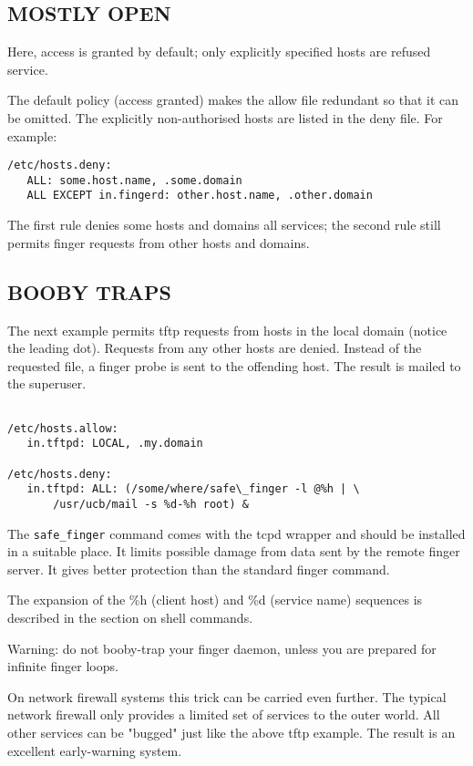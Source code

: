\documentclass[11pt,twoside,onecolumn]{book}
\begin{document}
\subsection*{MOSTLY OPEN}

Here, access is granted by default; only explicitly specified hosts are
refused service. 

The default policy (access granted) makes the allow file redundant so
that it can be omitted.  The explicitly non-authorised hosts are listed
in the deny file. For example:

{\small
\begin{verbatim}
/etc/hosts.deny:
   ALL: some.host.name, .some.domain
   ALL EXCEPT in.fingerd: other.host.name, .other.domain
\end{verbatim}
}

The first rule denies some hosts and domains all services; the second
rule still permits finger requests from other hosts and domains.


\subsection*{BOOBY TRAPS}

The next example permits tftp requests from hosts in the local domain
(notice the leading dot).  Requests from any other hosts are denied.
Instead of the requested file, a finger probe is sent to the offending
host. The result is mailed to the superuser.

{\small
\begin{verbatim}

/etc/hosts.allow:
   in.tftpd: LOCAL, .my.domain

/etc/hosts.deny:
   in.tftpd: ALL: (/some/where/safe\_finger -l @%h | \
       /usr/ucb/mail -s %d-%h root) &
\end{verbatim}
}

The {\tt safe\_finger} command comes with the tcpd wrapper and should be
installed in a suitable place. It limits possible damage from data sent
by the remote finger server.  It gives better protection than the
standard finger command.

The expansion of the \%h (client host) and \%d (service name) sequences
is described in the section on shell commands.

Warning: do not booby-trap your finger daemon, unless you are prepared
for infinite finger loops.

On network firewall systems this trick can be carried even further.
The typical network firewall only provides a limited set of services to
the outer world. All other services can be "bugged" just like the above
tftp example. The result is an excellent early-warning system.
\end{document}
